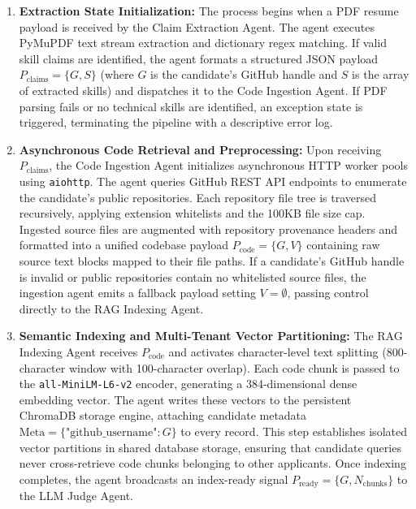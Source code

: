 \begin{enumerate}[leftmargin=*, label=\arabic*.]
    \item \textbf{Extraction State Initialization:} The process begins when a PDF resume payload is received by the Claim Extraction Agent. The agent executes PyMuPDF text stream extraction and dictionary regex matching. If valid skill claims are identified, the agent formats a structured JSON payload $P_{\text{claims}} = \{G, S\}$ (where $G$ is the candidate's GitHub handle and $S$ is the array of extracted skills) and dispatches it to the Code Ingestion Agent. If PDF parsing fails or no technical skills are identified, an exception state is triggered, terminating the pipeline with a descriptive error log.
    
    \item \textbf{Asynchronous Code Retrieval and Preprocessing:} Upon receiving $P_{\text{claims}}$, the Code Ingestion Agent initializes asynchronous HTTP worker pools using \texttt{aiohttp}. The agent queries GitHub REST API endpoints to enumerate the candidate's public repositories. Each repository file tree is traversed recursively, applying extension whitelists and the 100KB file size cap. Ingested source files are augmented with repository provenance headers and formatted into a unified codebase payload $P_{\text{code}} = \{G, V\}$ containing raw source text blocks mapped to their file paths. If a candidate's GitHub handle is invalid or public repositories contain no whitelisted source files, the ingestion agent emits a fallback payload setting $V = \emptyset$, passing control directly to the RAG Indexing Agent.
    
    \item \textbf{Semantic Indexing and Multi-Tenant Vector Partitioning:} The RAG Indexing Agent receives $P_{\text{code}}$ and activates character-level text splitting (800-character window with 100-character overlap). Each code chunk is passed to the \texttt{all-MiniLM-L6-v2} encoder, generating a 384-dimensional dense embedding vector. The agent writes these vectors to the persistent ChromaDB storage engine, attaching candidate metadata $\text{Meta} = \{\text{"github\_username"}: G\}$ to every record. This step establishes isolated vector partitions in shared database storage, ensuring that candidate queries never cross-retrieve code chunks belonging to other applicants. Once indexing completes, the agent broadcasts an index-ready signal $P_{\text{ready}} = \{G, N_{\text{chunks}}\}$ to the LLM Judge Agent.
    

\end{enumerate}
